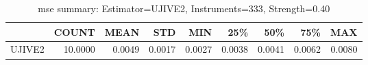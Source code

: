 \begin{table}[ht]
\centering
\caption{mse summary: Estimator=UJIVE2, Instruments=333, Strength=0.40}
\begin{tabular}{lrrrrrrrr}
\toprule
 & COUNT & MEAN & STD & MIN & 25\% & 50\% & 75\% & MAX \\
\midrule
UJIVE2 & 10.0000 & 0.0049 & 0.0017 & 0.0027 & 0.0038 & 0.0041 & 0.0062 & 0.0080 \\
\bottomrule
\end{tabular}
\end{table}
